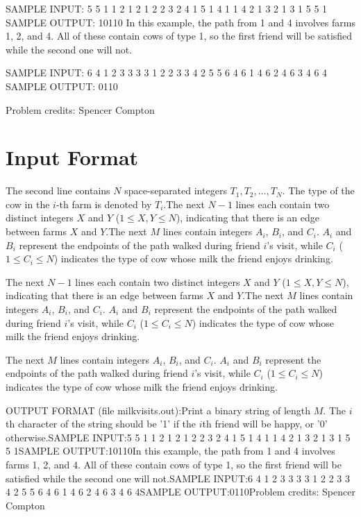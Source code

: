 \documentclass[12pt]{article}
\begin{document}
SAMPLE INPUT:
5 5
1 1 2 1 2
1 2
2 3
2 4
1 5
1 4 1
1 4 2
1 3 2
1 3 1
5 5 1
SAMPLE OUTPUT: 
10110
In this example, the path from 1 and 4 involves farms 1, 2, and 4. All of these
contain cows of type 1, so the first friend will be satisfied while the second
one will not.

SAMPLE INPUT:
6 4
1 2 3 3 3 3
1 2
2 3
3 4
2 5
5 6
4 6 1
4 6 2
4 6 3
4 6 4
SAMPLE OUTPUT: 
0110

Problem credits: Spencer Compton



\section*{Input Format}
The second line contains $N$ space-separated integers $T_1,T_2,\ldots, T_N.$ The
type of the cow in the $i$-th farm is denoted by $T_i.$The next $N-1$ lines each contain two distinct integers $X$ and $Y$ 
($1 \leq X, Y \leq N$), indicating that there is an edge between farms $X$ and
$Y$.The next $M$ lines contain integers $A_i$, $B_i$, and $C_i$. $A_i$ and $B_i$
represent the endpoints of the path walked during friend $i$'s visit, while
$C_i$ ($1\le C_i\le N$) indicates the type of cow whose milk the friend enjoys
drinking.

The next $N-1$ lines each contain two distinct integers $X$ and $Y$ 
($1 \leq X, Y \leq N$), indicating that there is an edge between farms $X$ and
$Y$.The next $M$ lines contain integers $A_i$, $B_i$, and $C_i$. $A_i$ and $B_i$
represent the endpoints of the path walked during friend $i$'s visit, while
$C_i$ ($1\le C_i\le N$) indicates the type of cow whose milk the friend enjoys
drinking.

The next $M$ lines contain integers $A_i$, $B_i$, and $C_i$. $A_i$ and $B_i$
represent the endpoints of the path walked during friend $i$'s visit, while
$C_i$ ($1\le C_i\le N$) indicates the type of cow whose milk the friend enjoys
drinking.

OUTPUT FORMAT (file milkvisits.out):Print a binary string of length $M.$ The $i$th character of the string should be
'1' if the $i$th friend will be happy, or '0' otherwise.SAMPLE INPUT:5 5
1 1 2 1 2
1 2
2 3
2 4
1 5
1 4 1
1 4 2
1 3 2
1 3 1
5 5 1SAMPLE OUTPUT:10110In this example, the path from 1 and 4 involves farms 1, 2, and 4. All of these
contain cows of type 1, so the first friend will be satisfied while the second
one will not.SAMPLE INPUT:6 4
1 2 3 3 3 3
1 2
2 3
3 4
2 5
5 6
4 6 1
4 6 2
4 6 3
4 6 4SAMPLE OUTPUT:0110Problem credits: Spencer Compton
\end{document}
